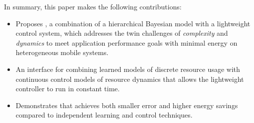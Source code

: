 In summary, this paper makes the following contributions:
\begin{itemize}
\item Proposes \SYSTEM{}, a combination of a hierarchical Bayesian model with a
  lightweight control system, which addresses the twin challenges of \emph{complexity} and \emph{dynamics} to meet application performance goals with minimal energy on heterogeneous mobile systems.
\item An interface for combining learned models of discrete resource
  usage with continuous control models of resource dynamics that allows the lightweight controller to run in constant time.
\item Demonstrates that \SYSTEM{} achieves both smaller error and higher energy savings compared to independent learning and control techniques.
\end{itemize}